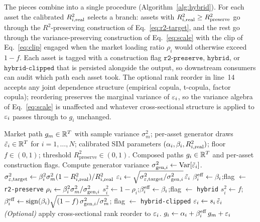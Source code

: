 The pieces combine into a single procedure (Algorithm~\ref{alg:hybrid}).
For each asset the calibrated $R^2_{i,\mathrm{real}}$ selects a branch: assets with
$R^2_{i,\mathrm{real}} \ge R^2_{\mathrm{preserve}}$ go through the
$R^2$-preserving construction of Eq.~\eqref{eq:r2-target}, and the
rest go through the variance-preserving construction of
Eq.~\eqref{eq:scale} with the clip of Eq.~\eqref{eq:clip} engaged
when the market loading ratio $\rho_i$ would otherwise exceed $1 - f$. Each asset is tagged
with a construction flag $\texttt{r2-preserve}$, $\texttt{hybrid}$,
or $\texttt{hybrid-clipped}$ that is persisted alongside the output,
so downstream consumers can audit which path each asset took. The optional rank reorder in line~14 accepts any
joint dependence structure (empirical copula, t-copula, factor
copula); reordering preserves the marginal variance of $\varepsilon_i$, so
the variance algebra of Eq.~\eqref{eq:scale} is unaffected and
whatever cross-sectional structure is applied to $\varepsilon_i$ passes
through to $g_i$ unchanged.

\begin{algorithm}[t]
\caption{Hybrid SIM composition with variance correction.}
\label{alg:hybrid}
\begin{algorithmic}[1]
  \REQUIRE Market path $g_m \in \mathbb{R}^T$ with sample variance $\sigma_m^2$;
    per-asset generator draws $\tilde{\varepsilon}_i \in \mathbb{R}^T$ for $i = 1,\dots,N$;
    calibrated SIM parameters $(\alpha_i, \beta_i, R^2_{i,\mathrm{real}})$;
    floor $f \in (0,1)$; threshold $R^2_{\mathrm{preserve}} \in (0,1)$.
  \ENSURE Composed paths $g_i \in \mathbb{R}^T$ and per-asset construction flags.
    \STATE Compute generator variance $\sigma_{\mathrm{gen},i}^2 \gets \operatorname{Var}[\tilde{\varepsilon}_i]$.
      \STATE $\sigma_{\varepsilon,\mathrm{target}}^2 \gets \beta_i^2 \sigma_m^2 (1 - R^2_{i,\mathrm{real}})/R^2_{i,\mathrm{real}}$
        \hfill {}
      \STATE $\varepsilon_i \gets \sqrt{\sigma_{\varepsilon,\mathrm{target}}^2 / \sigma_{\mathrm{gen},i}^2}\,\tilde{\varepsilon}_i$
      \STATE $\beta_i^{\mathrm{eff}} \gets \beta_i$;\quad flag $\gets$ \texttt{r2-preserve}
    \ELSE
      \STATE $\rho_i \gets \beta_i^2 \sigma_m^2 / \sigma_{\mathrm{gen},i}^2$
        \hfill {}
        \STATE $s_i^2 \gets 1 - \rho_i$;\quad $\beta_i^{\mathrm{eff}} \gets \beta_i$;\quad flag $\gets$ \texttt{hybrid}
      \ELSE
        \STATE $s_i^2 \gets f$;\quad
          $\beta_i^{\mathrm{eff}} \gets \operatorname{sign}(\beta_i)\sqrt{(1-f)\,\sigma_{\mathrm{gen},i}^2/\sigma_m^2}$;\quad
          flag $\gets$ \texttt{hybrid-clipped}
      \ENDIF
      \STATE $\varepsilon_i \gets s_i\,\tilde{\varepsilon}_i$
    \ENDIF
    \STATE \textit{(Optional)} apply cross-sectional rank reorder to $\varepsilon_i$.
    \STATE $g_i \gets \alpha_i + \beta_i^{\mathrm{eff}}\, g_m + \varepsilon_i$
      \hfill {}
  \ENDFOR
\end{algorithmic}
\end{algorithm}

